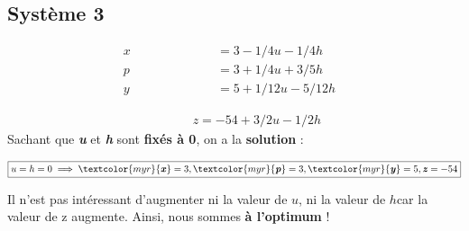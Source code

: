 \documentclass{report}
\newcommand{\Pointilles}[1]{%
  \par\nobreak
  \noindent\rule{0pt}{1.5\baselineskip}%
  \multido{}{#1}{\noindent\makebox[\linewidth]{\dotfill}\endgraf}%
  \bigskip%
}
\begin{document}
\begin{multicols*}{3}
\section{Système 3}
\begin{align*}
    x \quad\quad\quad\quad\quad\quad &= 3 - 1/4u -1/4h& \\
    p \quad\quad\quad\quad  &= 3 +1/4u +3/5h& \\
    y \quad\quad &= 5 + 1/12u -5/12h&
\end{align*}
\vspace{-2.5em}    
\Pointilles{1}
\vspace{-2.5em}
\begin{align*}
    \quad\quad\quad\;\; z = -54 +3/2u -1/2h
\end{align*}
Sachant que 
\textcolor{myb}{\textbf{\textit{u}}} et 
\textcolor{myb}{\textbf{\textit{h}}}  sont \textbf{fixés à 0}, 
on a la \textbf{solution} : 

\begin{align*}
\boxed{u = h = 0 \implies 
\textcolor{myr}{\textbf{\textit{x}}}  = 3, 
\textcolor{myr}{\textbf{\textit{p}}} = 3,
\textcolor{myr}{\textbf{\textit{y}}} = 5,
\textbf{\textit{z}} = -54}
\end{align*}

Il n’est pas intéressant d’augmenter ni la valeur de $u$, ni la valeur de $h$car la valeur 
de z augmente. Ainsi, nous sommes \textbf{à l’optimum} !





\end{multicols*}
            
\end{document}
